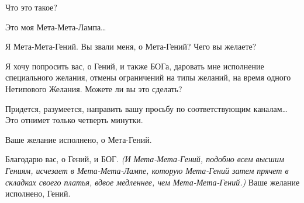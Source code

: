 \documentclass[../main.tex]{subfiles}
\begin{document}
\begin{Dialogue}
\begin{sublevel}
\begin{sublevel}
\begin{sublevel}
 Что это такое?

 Это моя Мета-Мета-Лампа\ldots{}


\begin{sublevel}
     Я Мета-Мета-Гений. Вы звали меня, о Мета-Гений? Чего вы желаете?
\end{sublevel}

 Я хочу попросить вас, о Гений, и также БОГа, даровать мне исполнение специального желания, отмены ограничений на типы желаний, на время одного Нетипового Желания. Можете ли вы это сделать?

\begin{sublevel}
 Придется, разумеется, направить вашу просьбу по соответствующим каналам\ldots{} Это отнимет только четверть минутки.


\indent\enspace{}


Ваше желание исполнено, о Мета-Гений.

\end{sublevel}

 Благодарю вас, о Гений, и БОГ\@. \emph{(И Мета-Мета-Гений, подобно всем высшим Гениям, исчезает в Мета-Мета-Лампе, которую Мета-Гений затем прячет в складках своего платья, вдвое медленнее, чем Мета-Мета-Гений.)} Ваше желание исполнено, Гений.


\end{sublevel}
\end{sublevel}
\end{sublevel}
\end{Dialogue}
\end{document}

